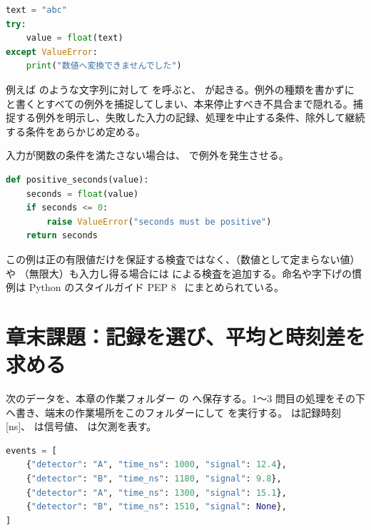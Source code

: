 \begin{lstlisting}[language=Python]
text = "abc"
try:
    value = float(text)
except ValueError:
    print("数値へ変換できませんでした")
\end{lstlisting}

例えば  のような文字列に対して  を呼ぶと、 が起きる。例外の種類を書かずに  と書くとすべての例外を捕捉してしまい、本来停止すべき不具合まで隠れる。捕捉する例外を明示し、失敗した入力の記録、処理を中止する条件、除外して継続する条件をあらかじめ定める。

入力が関数の条件を満たさない場合は、 で例外を発生させる。
\begin{lstlisting}[language=Python]
def positive_seconds(value):
    seconds = float(value)
    if seconds <= 0:
        raise ValueError("seconds must be positive")
    return seconds
\end{lstlisting}
この例は正の有限値だけを保証する検査ではなく、（数値として定まらない値）や （無限大）も入力し得る場合には  による検査を追加する。命名や字下げの慣例は Python のスタイルガイド PEP 8~\cite{pep8} にまとめられている。

\section{章末課題：記録を選び、平均と時刻差を求める}

次のデータを、本章の作業フォルダー  の  へ保存する。1～3 問目の処理をその下へ書き、端末の作業場所をこのフォルダーにして  を実行する。 は記録時刻 [ns]、 は信号値、 は欠測を表す。

\begin{lstlisting}[language=Python]
events = [
    {"detector": "A", "time_ns": 1000, "signal": 12.4},
    {"detector": "B", "time_ns": 1180, "signal": 9.8},
    {"detector": "A", "time_ns": 1300, "signal": 15.1},
    {"detector": "B", "time_ns": 1510, "signal": None},
]
\end{lstlisting}

